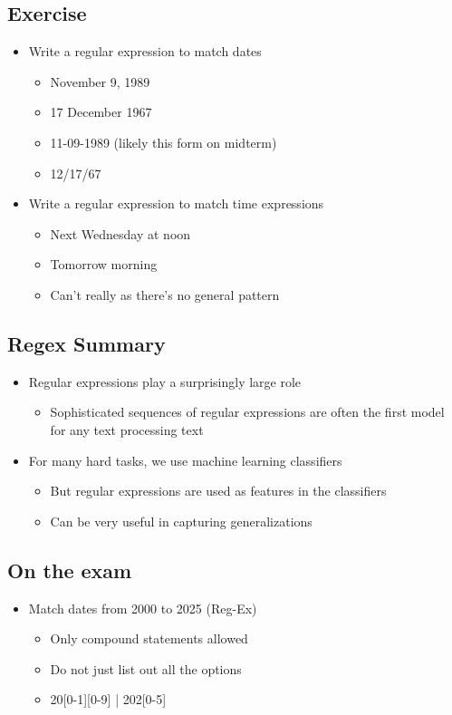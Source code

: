 \documentclass[11pt]{article}
\theoremstyle{definition}
\begin{document}
\subsection{Exercise}
\begin{itemize}
  \item Write a regular expression to match dates
  \begin{itemize}
    \item November 9, 1989
    \item 17 December 1967
    \item 11-09-1989 (likely this form on midterm)
    \item 12/17/67
  \end{itemize}
  \item Write a regular expression to match time expressions
  \begin{itemize}
    \item Next Wednesday at noon
    \item Tomorrow morning
    \item Can't really as there's no general pattern
  \end{itemize}
\end{itemize}

\subsection{Regex Summary}
\begin{itemize}
  \item Regular expressions play a surprisingly large role
  \begin{itemize}
    \item Sophisticated sequences of regular expressions are often the first model
    for any text processing text
  \end{itemize}
\end{itemize}
\begin{itemize}
  \item For many hard tasks, we use machine learning classifiers
  \begin{itemize}
    \item But regular expressions are used as features in the classifiers
    \item Can be very useful in capturing generalizations
  \end{itemize}
\end{itemize}

\subsection{On the exam}
\begin{itemize}
  \item Match dates from 2000 to 2025 (Reg-Ex)
  \begin{itemize}
    \item Only compound statements allowed
    \item Do not just list out all the options
    \item 20[0-1][0-9] | 202[0-5]
  \end{itemize}
\end{itemize}
\end{document}
